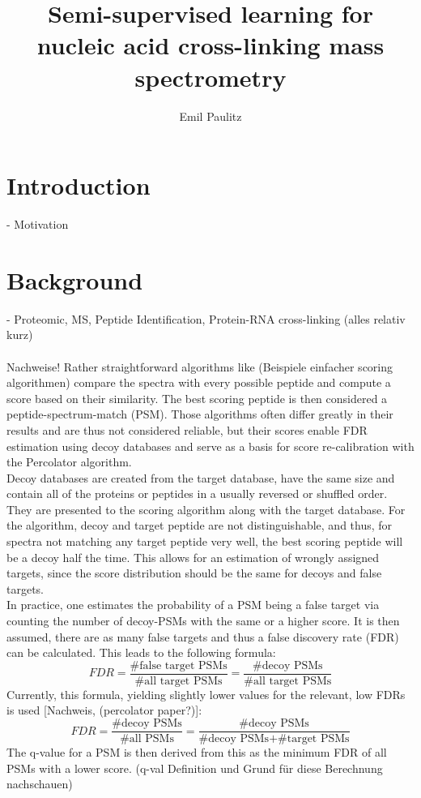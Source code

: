 \documentclass[10pt,a4paper]{article}
\author{Emil Paulitz}
\title{Semi-supervised learning for nucleic acid cross-linking mass spectrometry}
\begin{document}
	\ohead{\theauthor}
	\cfoot{\pagemark}
	\maketitle
	\tableofcontents
	
	\section{Introduction}
		- Motivation
	\section{Background}	
		- Proteomic, MS, Peptide Identification, Protein-RNA cross-linking (alles relativ kurz)\\
		\\
		Nachweise!
		Rather straightforward algorithms like (Beispiele einfacher scoring algorithmen) compare the spectra with every possible peptide and compute a score based on their similarity. The best scoring peptide is then considered a peptide-spectrum-match (PSM). Those algorithms often differ greatly in their results and are thus not considered reliable, but their scores enable FDR estimation using decoy databases and serve as a basis for score re-calibration with the Percolator algorithm.\\
		Decoy databases are created from the target database, have the same size and contain all of the proteins or peptides in a usually reversed or shuffled order. They are presented to the scoring algorithm along with the target database. For the algorithm, decoy and target peptide are not distinguishable, and thus, for spectra not matching any target peptide very well, the best scoring peptide will be a decoy half the time. This allows for an estimation of wrongly assigned targets, since the score distribution should be the same for decoys and false targets.\\
		In practice, one estimates the probability of a PSM being a false target via counting the number of decoy-PSMs with the same or a higher score. It is then assumed, there are as many false targets and thus a false discovery rate (FDR) can be calculated. This leads to the following formula:
		\begin{equation}
		FDR = \frac{\text{\# false target PSMs}}{\text{\# all target PSMs}} =  \frac{\text{\# decoy PSMs}}{\text{\# all target PSMs}}
		\end{equation}
		Currently, this formula, yielding slightly lower values for the relevant, low FDRs is used [Nachweis, (percolator paper?)]: 
		\begin{equation}
		FDR = \frac{\text{\# decoy PSMs}}{\text{\# all PSMs}} = \frac{\text{\# decoy PSMs}}{\text{\# decoy PSMs} + \text{\# target PSMs}}
		\end{equation}
		The q-value for a PSM is then derived from this as the minimum FDR of all PSMs with a lower score. (q-val Definition und Grund für diese Berechnung nachschauen) %
		
\end{document}
